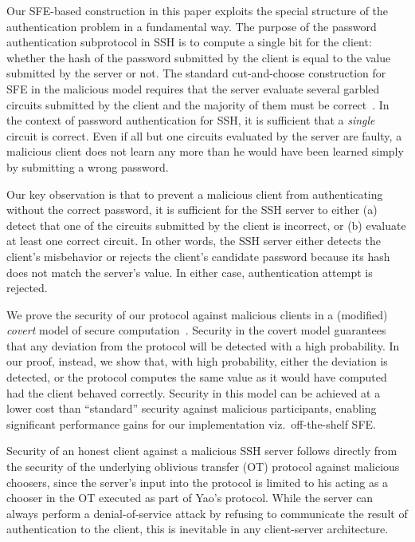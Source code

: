 Our SFE-based construction in this paper exploits the special structure
of the authentication problem in a fundamental way.  The purpose of
the password authentication subprotocol in SSH is to compute a single
bit for the client: whether the hash of the password submitted by the
client is equal to the value submitted by the server or not.  The standard
cut-and-choose construction for SFE in the malicious model requires that
the server evaluate several garbled circuits submitted by the client and
the majority of them must be correct~\cite{lindellpinkas-eurocrypt07}.
In the context of password authentication for SSH, it is sufficient that a
\emph{single} circuit is correct.  Even if all but one circuits evaluated
by the server are faulty, a malicious client does not learn any more
than he would have been learned simply by submitting a wrong password.


Our key observation is that to prevent a malicious client from
authenticating without the correct password, it is sufficient for the
SSH server to either (a) detect that one of the circuits submitted by
the client is incorrect, or (b) evaluate at least one correct circuit.
In other words, the SSH server either detects the client's misbehavior or
rejects the client's candidate password because its hash does not match
the server's value.  In either case, authentication attempt is rejected.

We prove the security of our protocol against malicious
clients in a (modified) \emph{covert} model of secure
computation~\cite{aumannlindell,goyalmohasselsmith-eurocrypt08}.
Security in the covert model guarantees that any deviation from the
protocol will be detected with a high probability.  In our proof, instead,
we show that, with high probability, either the deviation is detected,
or the protocol computes the same value as it would have computed had the
client behaved correctly.  Security in this model can be achieved at a
lower cost than ``standard'' security against malicious participants,
enabling significant performance gains for our implementation viz.\
off-the-shelf SFE.

Security of an honest client against a malicious SSH server follows
directly from the security of the underlying oblivious transfer (OT)
protocol against malicious choosers, since the server's input into
the protocol is limited to his acting as a chooser in the OT executed
as part of Yao's protocol.  While the server can always perform a
denial-of-service attack by refusing to communicate the result of
authentication to the client, this is inevitable in any client-server
architecture.

